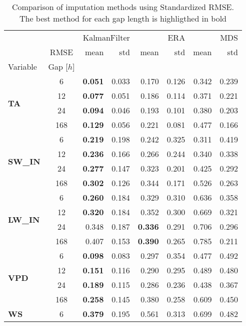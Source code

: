\begin{table}
\centering
\caption{Comparison of imputation methods using Standardized RMSE. The best method for each gap length is highligthed in bold}
\label{the_table_stand}
\begin{tabular}{p{2.1cm}c|rr|rr|rr}
\toprule
 &  & \multicolumn{2}{r}{KalmanFilter} & \multicolumn{2}{r}{ERA} & \multicolumn{2}{r}{MDS} \\
 & RMSE & mean & std & mean & std & mean & std \\
Variable & Gap [$h$] &  &  &  &  &  &  \\
\midrule
\multirow[c]{4}{*}{\parbox{2.1cm}{\textbf{TA}}} & 6 & \bfseries 0.051 & 0.033 & 0.170 & 0.126 & 0.342 & 0.239 \\
 & 12 & \bfseries 0.077 & 0.051 & 0.186 & 0.114 & 0.371 & 0.221 \\
 & 24 & \bfseries 0.094 & 0.046 & 0.193 & 0.101 & 0.380 & 0.203 \\
 & 168 & \bfseries 0.129 & 0.056 & 0.221 & 0.081 & 0.477 & 0.166 \\
\cline{1-8}
\multirow[c]{4}{*}{\parbox{2.1cm}{\textbf{SW\_IN}}} & 6 & \bfseries 0.219 & 0.198 & 0.242 & 0.325 & 0.311 & 0.419 \\
 & 12 & \bfseries 0.236 & 0.166 & 0.266 & 0.244 & 0.340 & 0.338 \\
 & 24 & \bfseries 0.277 & 0.147 & 0.323 & 0.201 & 0.425 & 0.292 \\
 & 168 & \bfseries 0.302 & 0.126 & 0.344 & 0.171 & 0.526 & 0.263 \\
\cline{1-8}
\multirow[c]{4}{*}{\parbox{2.1cm}{\textbf{LW\_IN}}} & 6 & \bfseries 0.260 & 0.184 & 0.329 & 0.310 & 0.636 & 0.358 \\
 & 12 & \bfseries 0.320 & 0.184 & 0.352 & 0.300 & 0.669 & 0.321 \\
 & 24 & 0.348 & 0.187 & \bfseries 0.336 & 0.291 & 0.706 & 0.296 \\
 & 168 & 0.407 & 0.153 & \bfseries 0.390 & 0.265 & 0.785 & 0.211 \\
\cline{1-8}
\multirow[c]{4}{*}{\parbox{2.1cm}{\textbf{VPD}}} & 6 & \bfseries 0.098 & 0.083 & 0.297 & 0.354 & 0.477 & 0.492 \\
 & 12 & \bfseries 0.151 & 0.116 & 0.290 & 0.295 & 0.489 & 0.480 \\
 & 24 & \bfseries 0.189 & 0.115 & 0.286 & 0.236 & 0.438 & 0.367 \\
 & 168 & \bfseries 0.258 & 0.145 & 0.380 & 0.258 & 0.609 & 0.450 \\
\cline{1-8}
\multirow[c]{4}{*}{\parbox{2.1cm}{\textbf{WS}}} & 6 & \bfseries 0.379 & 0.195 & 0.561 & 0.313 & 0.699 & 0.482 \\

\end{tabular}
\end{table}
